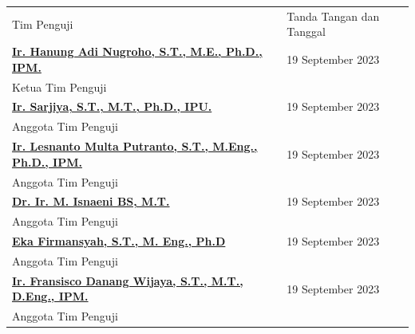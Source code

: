 {
\begin{longtable}{ll}
	\vspace*{1.5cm}
	\hspace*{27pt}Tim Penguji & \hspace*{-12pt}Tanda Tangan dan Tanggal\\
	\hspace*{-11pt}\underline{\textbf{Ir. Hanung Adi Nugroho, S.T., M.E., Ph.D., IPM.}}			& \hspace*{0.7cm} 19 September 2023\\ \vspace*{1cm}\hspace*{-11pt}Ketua Tim Penguji &\\
	\hspace*{-11pt}\underline{\textbf{Ir. Sarjiya, S.T., M.T., Ph.D., IPU.}}					& \hspace*{0.7cm} 19 September 2023\\ \vspace*{1cm}\hspace*{-11pt}Anggota Tim Penguji &\\
	\hspace*{-11pt}\underline{\textbf{Ir. Lesnanto Multa Putranto, S.T., M.Eng., Ph.D., IPM.}}	& \hspace*{0.7cm} 19 September 2023\\ \vspace*{1cm}\hspace*{-11pt}Anggota Tim Penguji &\\
	\hspace*{-11pt}\underline{\textbf{Dr. Ir. M. Isnaeni BS, M.T.}}								& \hspace*{0.7cm} 19 September 2023\\ \vspace*{1cm}\hspace*{-11pt}Anggota Tim Penguji &\\
	\hspace*{-11pt}\underline{\textbf{Eka Firmansyah, S.T., M. Eng., Ph.D}}						& \hspace*{0.7cm} 19 September 2023\\ \vspace*{1cm}\hspace*{-11pt}Anggota Tim Penguji &\\
	\hspace*{-11pt}\underline{\textbf{Ir. Fransisco Danang Wijaya, S.T., M.T., D.Eng., IPM.}}	& \hspace*{0.7cm} 19 September 2023\\ 			  \hspace*{-11pt}Anggota Tim Penguji &\\
\end{longtable}
}
